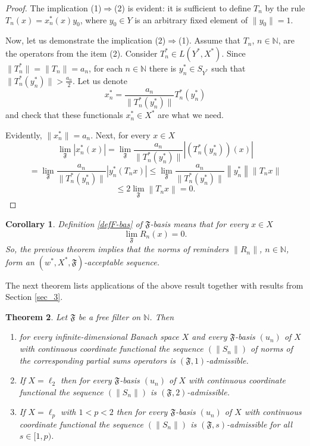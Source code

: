 \documentclass[11pt,twoside, reqno]{amsart}
\newcommand{\N}{{\mathbb N}}
\newcommand{\F}{\mathfrak{F}}
\newcommand{\flim}{\lim\limits_\F }
\theoremstyle{plain}
\newtheorem{theorem}{Theorem}[section]
\newtheorem{corollary}[theorem]{Corollary}
\theoremstyle{remark}
\theoremstyle{definition}
\numberwithin{equation}{section}
\begin{document}
\begin{proof}
The implication (1)$\Longrightarrow$(2) is evident: it is sufficient to define $T_n$ by the rule $T_n(x) = x_n^*(x)y_0$, where $y_0 \in Y$ is an arbitrary fixed element of $\|y_0\| = 1$.

Now, let us demonstrate the implication (2)$\Longrightarrow$(1). Assume that $T_n$, $n \in {\mathbb{N}}$, are the operators from the item (2). Consider $T_n^* \in L(Y^*,X^*)$. Since  $\|T_n^*\| = \|T_n\|=a_n$, for each $n \in {\mathbb{N}}$ there is $y_n^* \in S_{Y^*}$ such that $\|T_n^*(y_n^*)\|  > \frac{a_n}{2}$. Let us denote 
$$
x_n^*=\frac{a_n}{\|T_n^*(y_n^*)\|}T_n^*(y_n^*)
$$
and check that these functionals $x_n^* \in X^*$ are what we need.

Evidently, $\|x_n^*\|=a_n$. Next,  for every $x \in X$
$$
\flim \left|x_n^*(x)\right| = \flim \frac{a_n}{\|T_n^*(y_n^*)\|}\left|(T_n^*(y_n^*))(x)\right|
$$
$$
= \flim \frac{a_n}{\|T_n^*(y_n^*)\|}\left|y_n^*(T_n x)\right|\leq \flim \frac{a_n}{\|T_n^*(y_n^*)\|}\left\|y_n^*\right\|\left\|T_n x\right\|
$$
$$
\leq 2\flim \left\|T_n x\right\| = 0.
$$
\end{proof}

\begin{corollary}  \label{cor-rem1}
Definition \ref{defF-bas} of $\F$-basis means that for every $x \in X$
$$
\flim R_n(x) = 0.
$$
So, the previous theorem implies that the norms of reminders $\|R_n\|$, $n \in \N$, form an $(w^*, X^*, \mathfrak F)$-acceptable sequence.
\end{corollary}

The next theorem lists applications of the above result together with results from Section \ref{sec_3}.

\begin{theorem}  \label{thm-F-bas-nec}
Let $\F$ be a free filter on $\N$. Then
\begin{enumerate}
\item[(i)] for every infinite-dimensional Banach space $X$ and every $\F$-basis $(u_n)$ of $X$ with continuous coordinate functional the sequence $\left(\|S_n\|\right)$ of norms of the corresponding partial sums operators is $(\F, 1)$-admissible.

\item[(ii)] If $X=\ell_2$ then for every $\F$-basis $(u_n)$ of $X$ with continuous coordinate functional the sequence $\left(\|S_n\|\right)$ is $(\F, 2)$-admissible.

\item[(iii)]If $X=\ell_p$ with $1 < p < 2$ then for every $\F$-basis $(u_n)$ of $X$ with continuous coordinate functional the sequence $\left(\|S_n\|\right)$ is $(\F, s)$-admissible for all $s \in [1, p)$.
\end{enumerate}
\end{theorem}
\end{document}
